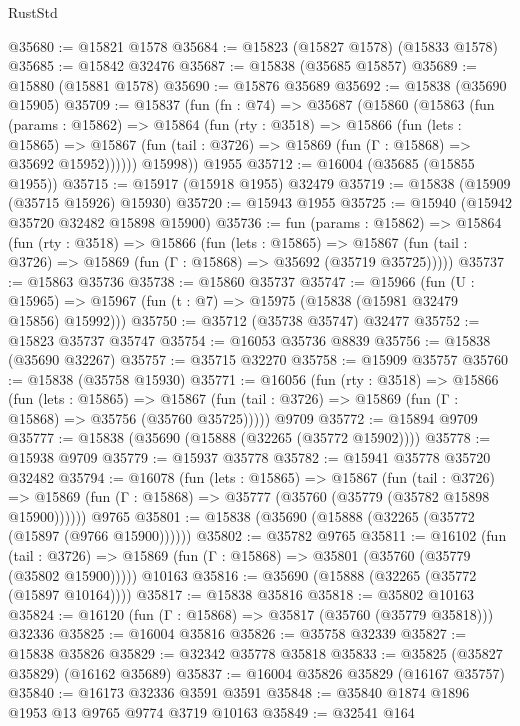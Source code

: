 \begin{lexlean}{RustStd}
\begin{coremodule}
@35680 := @15821 @1578
@35684 := @15823 (@15827 @1578) (@15833 @1578)
@35685 := @15842 @32476
@35687 := @15838 (@35685 @15857)
@35689 := @15880 (@15881 @1578)
@35690 := @15876 @35689
@35692 := @15838 (@35690 @15905)
@35709 := @15837
    (fun (fn : @74) =>
    @35687
      (@15860
        (@15863
          (fun (params : @15862) =>
          @15864
            (fun (rty : @3518) =>
            @15866
              (fun (lets : @15865) =>
              @15867 (fun (tail : @3726) => @15869 (fun (Γ : @15868) => @35692 @15952))))))
        @15998))
    @1955
@35712 := @16004 (@35685 (@15855 @1955))
@35715 := @15917 (@15918 @1955) @32479
@35719 := @15838 (@15909 (@35715 @15926) @15930)
@35720 := @15943 @1955
@35725 := @15940 (@15942 @35720 @32482 @15898 @15900)
@35736 := fun (params : @15862) =>
  @15864
    (fun (rty : @3518) =>
    @15866
      (fun (lets : @15865) =>
      @15867 (fun (tail : @3726) => @15869 (fun (Γ : @15868) => @35692 (@35719 @35725)))))
@35737 := @15863 @35736
@35738 := @15860 @35737
@35747 := @15966
    (fun (U : @15965) => @15967 (fun (t : @7) => @15975 (@15838 (@15981 @32479 @15856) @15992)))
@35750 := @35712 (@35738 @35747) @32477
@35752 := @15823 @35737 @35747
@35754 := @16053 @35736 @8839
@35756 := @15838 (@35690 @32267)
@35757 := @35715 @32270
@35758 := @15909 @35757
@35760 := @15838 (@35758 @15930)
@35771 := @16056
    (fun (rty : @3518) =>
    @15866
      (fun (lets : @15865) =>
      @15867 (fun (tail : @3726) => @15869 (fun (Γ : @15868) => @35756 (@35760 @35725)))))
    @9709
@35772 := @15894 @9709
@35777 := @15838 (@35690 (@15888 (@32265 (@35772 @15902))))
@35778 := @15938 @9709
@35779 := @15937 @35778
@35782 := @15941 @35778 @35720 @32482
@35794 := @16078
    (fun (lets : @15865) =>
    @15867
      (fun (tail : @3726) =>
      @15869 (fun (Γ : @15868) => @35777 (@35760 (@35779 (@35782 @15898 @15900))))))
    @9765
@35801 := @15838 (@35690 (@15888 (@32265 (@35772 (@15897 (@9766 @15900))))))
@35802 := @35782 @9765
@35811 := @16102
    (fun (tail : @3726) => @15869 (fun (Γ : @15868) => @35801 (@35760 (@35779 (@35802 @15900)))))
    @10163
@35816 := @35690 (@15888 (@32265 (@35772 (@15897 @10164))))
@35817 := @15838 @35816
@35818 := @35802 @10163
@35824 := @16120 (fun (Γ : @15868) => @35817 (@35760 (@35779 @35818))) @32336
@35825 := @16004 @35816
@35826 := @35758 @32339
@35827 := @15838 @35826
@35829 := @32342 @35778 @35818
@35833 := @35825 (@35827 @35829) (@16162 @35689)
@35837 := @16004 @35826 @35829 (@16167 @35757)
@35840 := @16173 @32336 @3591 @3591
@35848 := @35840 @1874 @1896 @1953 @13 @9765 @9774 @3719 @10163
@35849 := @32541 @164

\end{coremodule}
\end{lexlean}
